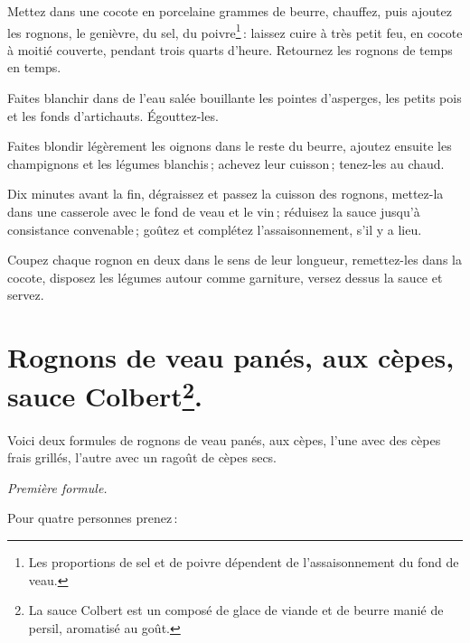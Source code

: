 Mettez dans une cocote en porcelaine {\mmm} grammes de beurre, chauffez, puis
ajoutez les rognons, le genièvre, du sel, du poivre\footnote{Les proportions de
sel et de poivre dépendent de l’assaisonnement du fond de veau.} : laissez
cuire à très petit feu, en cocote à moitié couverte, pendant trois quarts
d'heure. Retournez les rognons de temps en temps.

Faites blanchir dans de l'eau salée bouillante les pointes d'asperges, les petits
pois et les fonds d'artichauts. Égouttez-les.

Faites blondir légèrement les oignons dans le reste du beurre, ajoutez ensuite
les champignons et les légumes blanchis ; achevez leur cuisson ; tenez-les au
chaud.

Dix minutes avant la fin, dégraissez et passez la cuisson des rognons, mettez-la
dans une casserole avec le fond de veau et le vin ; réduisez la sauce jusqu'à
consistance convenable ; goûtez et complétez l'assaisonnement, s'il y a lieu.

Coupez chaque rognon en deux dans le sens de leur longueur, remettez-les dans
la cocote, disposez les légumes autour comme garniture, versez dessus la sauce
et servez.

\section*{\centering Rognons de veau panés, aux cèpes, sauce
Colbert\footnote{La sauce Colbert est un composé de glace de viande et de
beurre manié de persil, aromatisé au goût.}.}

 {}

Voici deux formules de rognons de veau panés, aux cèpes, l'une avec des cèpes
frais grillés, l'autre avec un ragoût de cèpes secs.

\medskip

\begin{center}
\textit{Première formule.}
\end{center}

\medskip

Pour quatre personnes prenez :

\medskip


